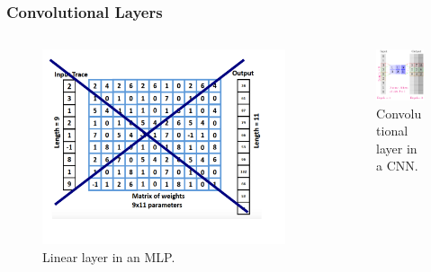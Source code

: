 \begin{frame}
\frametitle{Convolutional Layers}
\begin{columns}
\begin{column}{0.5\textwidth}
\begin{figure}
\includegraphics[width=.9\textwidth]{figures/FC_no.png} 
\caption{Linear layer in an MLP.}
\end{figure}
\end{column}
\begin{column}{0.5\textwidth}
\begin{figure}
\includegraphics[width=.9\textwidth]{../tikz_per_manuscritto/conv_filter_2_1.pdf} 
\caption{Convolutional layer in a CNN.}
\end{figure}
\end{column}
\end{columns}
\end{frame}

